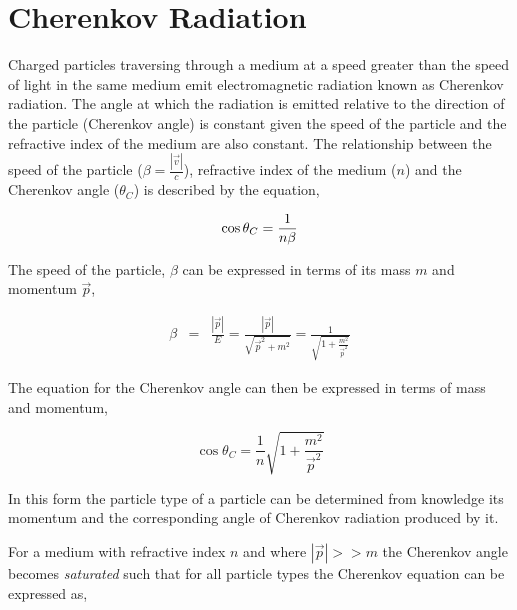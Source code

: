\section{Cherenkov Radiation}

Charged particles traversing through a medium at a speed greater than the speed of light in the same medium emit electromagnetic radiation known as Cherenkov radiation. The angle at which the radiation is emitted relative to the direction of the particle (Cherenkov angle) is constant given the speed of the particle and the refractive index of the medium are also constant. The relationship between the speed of the particle ($\beta = \frac{|\vec{v}|}{c}$), refractive index of the medium ($n$) and the Cherenkov angle ($\theta_C$) is described by the equation,

\begin{equation}
	\cos{\theta_C} = \frac{1}{n\beta}\\
	\label{equation: Cherenkov radiation}
\end{equation}

The speed of the particle, $\beta$ can be expressed in terms of its mass $m$ and momentum $\vec{p}$,

\begin{eqnarray}
	\beta&=&\frac{|\vec{p}|}{E}
	= \frac{|\vec{p}|}{\sqrt{\vec{p}^2 + m^2}}
	= \frac{1}{\sqrt{1 + \frac{m^2}{\vec{p}^2}}}
\end{eqnarray}

The equation for the Cherenkov angle can then be expressed in terms of mass and momentum,

\begin{equation}
	\cos{\theta_C} = \frac{1}{n}\sqrt{1 + \frac{m^2}{\vec{p}^2}}
	\label{equation: Cherenkov angle in terms of mass and momentum}
\end{equation}

In this form the particle type of a particle can be determined from knowledge its momentum and the corresponding angle of Cherenkov radiation produced by it. 

For a medium with refractive index $n$ and where $|\vec{p}| >> m$ the Cherenkov angle becomes \emph{saturated} such that for all particle types the Cherenkov equation can be expressed as,

